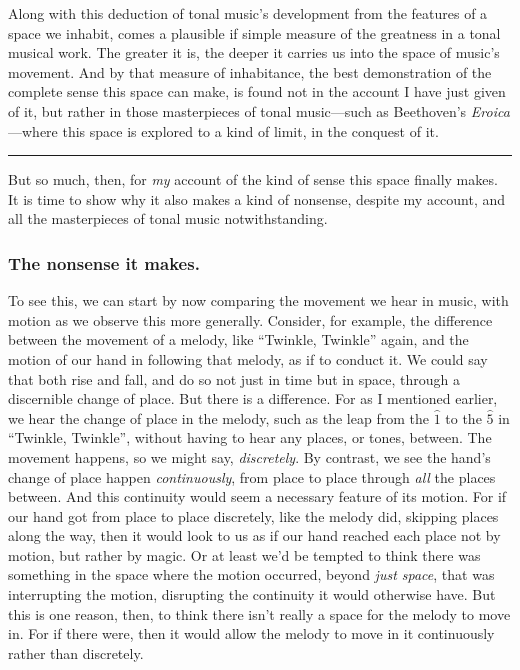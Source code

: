 \documentclass[12pt]{memoir}
\begin{document}
Along with this deduction of tonal music's development from the features
of a space we inhabit, comes a plausible if simple measure of the
greatness in a tonal musical work. The greater it is, the deeper it
carries us into the space of music's movement. And by that measure of
inhabitance, the best demonstration of the complete sense this space can
make, is found not in the account I have just given of it, but rather in
those masterpieces of tonal music---such as Beethoven's
\emph{Eroica}---where this space is explored to a kind of limit, in the
conquest of it.

\begin{center}\rule{3in}{0.4pt}\end{center}

But so much, then, for \emph{my} account of the kind of sense this space
finally makes. It is time to show why it also makes a kind of nonsense,
despite my account, and all the masterpieces of tonal music
notwithstanding.

\subsubsection{The nonsense it makes.}

To see this, we can start by now comparing the movement we hear in
music, with motion as we observe this more generally. Consider, for
example, the difference between the movement of a melody, like
``Twinkle, Twinkle'' again, and the motion of our hand in following that
melody, as if to conduct it. We could say that both rise and fall, and
do so not just in time but in space, through a discernible change of
place. But there is a difference. For as I mentioned earlier, we hear
the change of place in the melody, such as the leap from the $\hat{1}$ to
the $\hat{5}$ in ``Twinkle, Twinkle'', without having to hear any
places, or tones, between. The movement happens, so we might say,
\emph{discretely}. By contrast, we see the hand's change of place happen
\emph{continuously}, from place to place through \emph{all} the places
between. And this continuity would seem a necessary feature of its
motion. For if our hand got from place to place discretely, like the
melody did, skipping places along the way, then it would look to us as
if our hand reached each place not by motion, but rather by magic. Or at
least we'd be tempted to think there was something in the space where
the motion occurred, beyond \emph{just space}, that was interrupting the
motion, disrupting the continuity it would otherwise have. But this is
one reason, then, to think there isn't really a space for the melody to
move in. For if there were, then it would allow the melody to move in it
continuously rather than discretely.
\end{document}
